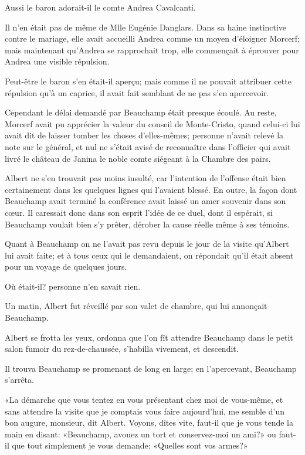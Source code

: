 Aussi le baron adorait-il le comte Andrea Cavalcanti. 

Il n'en était pas de même de Mlle Eugénie Danglars. Dans sa haine instinctive contre le mariage, elle avait accueilli Andrea comme un moyen d'éloigner Morcerf; mais maintenant qu'Andrea se rapprochait trop, elle commençait à éprouver pour Andrea une visible répulsion. 

Peut-être le baron s'en était-il aperçu; mais comme il ne pouvait attribuer cette répulsion qu'à un caprice, il avait fait semblant de ne pas s'en apercevoir. 

Cependant le délai demandé par Beauchamp était presque écoulé. Au reste, Morcerf avait pu apprécier la valeur du conseil de Monte-Cristo, quand celui-ci lui avait dit de laisser tomber les choses d'elles-mêmes; personne n'avait relevé la note sur le général, et nul ne s'était avisé de reconnaître dans l'officier qui avait livré le château de Janina le noble comte siégeant à la Chambre des pairs. 

Albert ne s'en trouvait pas moins insulté, car l'intention de l'offense était bien certainement dans les quelques lignes qui l'avaient blessé. En outre, la façon dont Beauchamp avait terminé la conférence avait laissé un amer souvenir dans son cœur. Il caressait donc dans son esprit l'idée de ce duel, dont il espérait, si Beauchamp voulait bien s'y prêter, dérober la cause réelle même à ses témoins. 

Quant à Beauchamp on ne l'avait pas revu depuis le jour de la visite qu'Albert lui avait faite; et à tous ceux qui le demandaient, on répondait qu'il était absent pour un voyage de quelques jours. 

Où était-il? personne n'en savait rien. 

Un matin, Albert fut réveillé par son valet de chambre, qui lui annonçait Beauchamp. 

Albert se frotta les yeux, ordonna que l'on fît attendre Beauchamp dans le petit salon fumoir du rez-de-chaussée, s'habilla vivement, et descendit. 

Il trouva Beauchamp se promenant de long en large; en l'apercevant, Beauchamp s'arrêta. 

«La démarche que vous tentez en vous présentant chez moi de vous-même, et sans attendre la visite que je comptais vous faire aujourd'hui, me semble d'un bon augure, monsieur, dit Albert. Voyons, dites vite, faut-il que je vous tende la main en disant: «Beauchamp, avouez un tort et conservez-moi un ami?» ou faut-il que tout simplement je vous demande: «Quelles sont vos armes?» 

